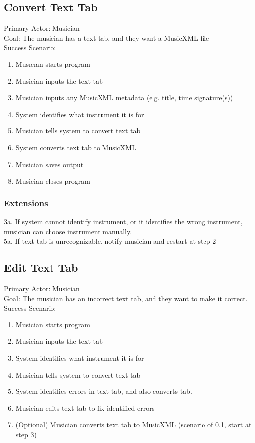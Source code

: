 \documentclass[11pt]{article}
\begin{document}
\subsection{Convert Text Tab}
\label{sec:org15aab59}
Primary Actor: Musician \\
Goal: The musician has a text tab, and they want a MusicXML file \\
Success Scenario:
\begin{enumerate}
\item Musician starts program
\item Musician inputs the text tab
\item Musician inputs any MusicXML metadata (e.g. title, time signature(s))
\item System identifies what instrument it is for
\item Musician tells system to convert text tab
\item System converts text tab to MusicXML
\item Musician saves output
\item Musician closes program
\end{enumerate}
\subsubsection{Extensions}
\label{sec:org820c59f}
3a. If system cannot identify instrument, or it identifies the wrong instrument, musician can choose instrument manually. \\
5a. If text tab is unrecognizable, notify musician and restart at step 2 \\
\subsection{Edit Text Tab}
\label{sec:org053b003}
Primary Actor: Musician \\
Goal: The musician has an incorrect text tab, and they want to make it correct. \\
Success Scenario:
\begin{enumerate}
\item Musician starts program
\item Musician inputs the text tab
\item System identifies what instrument it is for
\item Musician tells system to convert text tab
\item System identifies errors in text tab, and also converts tab.
\item Musician edits text tab to fix identified errors
\item (Optional) Musician converts text tab to MusicXML (scenario of \ref{sec:org15aab59}, start at step 3)
\end{enumerate}
\end{document}

